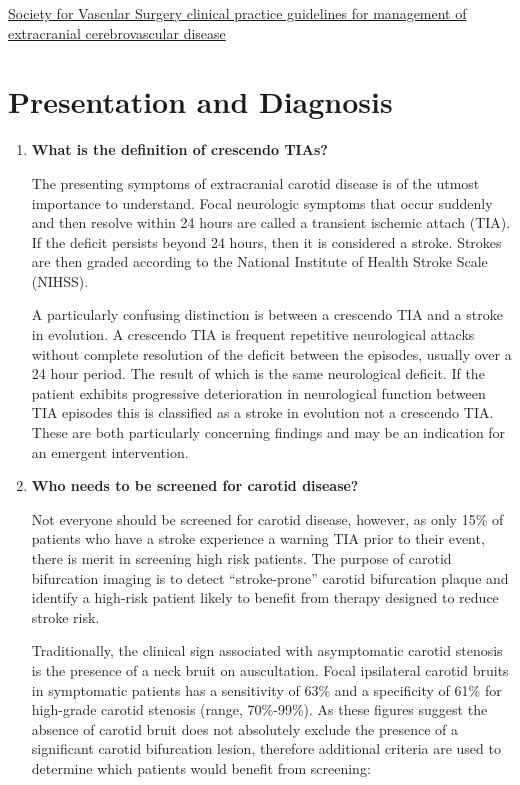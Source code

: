 \documentclass[
]{book}
\begin{document}
\href{https://www.jvascsurg.org/article/S0741-5214(21)00893-4/fulltext}{Society for Vascular Surgery clinical practice guidelines for
management of extracranial cerebrovascular
disease}
\citep{aburahmaSocietyVascularSurgery2022}

\hypertarget{presentation-and-diagnosis}{%
\section{Presentation and Diagnosis}\label{presentation-and-diagnosis}}

\begin{enumerate}
\def\labelenumi{\arabic{enumi}.}
\item
  \textbf{What is the definition of crescendo TIAs?}

  The presenting symptoms of extracranial carotid disease is of the
  utmost importance to understand. Focal neurologic symptoms that
  occur suddenly and then resolve within 24 hours are called a
  transient ischemic attach (TIA). If the deficit persists beyond 24
  hours, then it is considered a stroke. Strokes are then graded
  according to the National Institute of Health Stroke Scale
  (NIHSS).\citep{fischer2010}

  A particularly confusing distinction is between a crescendo TIA and
  a stroke in evolution. A crescendo TIA is frequent repetitive neurological
  attacks without complete resolution of the deficit between the
  episodes, usually over a 24 hour period. The result of which is the
  same neurological deficit. If the patient exhibits progressive
  deterioration in neurological function between TIA episodes this is
  classified as a stroke in evolution not a crescendo TIA.\citep{ricotta}
  These are both particularly concerning findings and may be an
  indication for an emergent intervention.
\item
  \textbf{Who needs to be screened for carotid disease?}

  Not everyone should be screened for carotid disease, however, as
  only 15\% of patients who have a stroke experience a warning TIA
  prior to their event, there is merit in screening high risk
  patients.\citep{rockman2019} The purpose of carotid bifurcation imaging
  is to detect ``stroke-prone'' carotid bifurcation plaque and identify
  a high-risk patient likely to benefit from therapy designed to
  reduce stroke risk.

  Traditionally, the clinical sign associated with asymptomatic
  carotid stenosis is the presence of a neck bruit on auscultation.
  Focal ipsilateral carotid bruits in symptomatic patients has a
  sensitivity of 63\% and a specificity of 61\% for high-grade carotid
  stenosis (range, 70\%-99\%). As these figures suggest the absence of
  carotid bruit does not absolutely exclude the presence of a
  significant carotid bifurcation lesion, therefore additional
  criteria are used to determine which patients would benefit from
  screening:


\end{enumerate}
\end{document}
